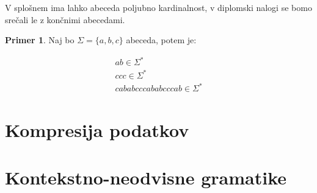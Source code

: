 \documentclass{amsart}
\theoremstyle{definition} %
\newtheorem{primer}[definicija]{Primer}
\theoremstyle{plain} %
\begin{document}
V splošnem ima lahko abeceda poljubno kardinalnost, v diplomski nalogi se bomo srečali le z končnimi abecedami.

\begin{primer}
    
    Naj bo $ \Sigma = \{ a,b,c \} $ abeceda, potem je:

    \begin{align*}
        ab \in \Sigma^* \\
        ccc \in \Sigma^* \\
        cababcccababcccab \in \Sigma^*
    \end{align*}

\end{primer}

\section{Kompresija podatkov}

\section{Kontekstno-neodvisne gramatike}
\end{document}
